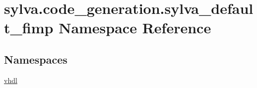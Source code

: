 \hypertarget{namespacesylva_1_1code__generation_1_1sylva__default__fimp}{}\section{sylva.\+code\+\_\+generation.\+sylva\+\_\+default\+\_\+fimp Namespace Reference}
\label{namespacesylva_1_1code__generation_1_1sylva__default__fimp}
\subsection*{Namespaces}
\begin{DoxyCompactItemize}
\item 
 \hyperlink{namespacesylva_1_1code__generation_1_1sylva__default__fimp_1_1vhdl}{vhdl}
\end{DoxyCompactItemize}
